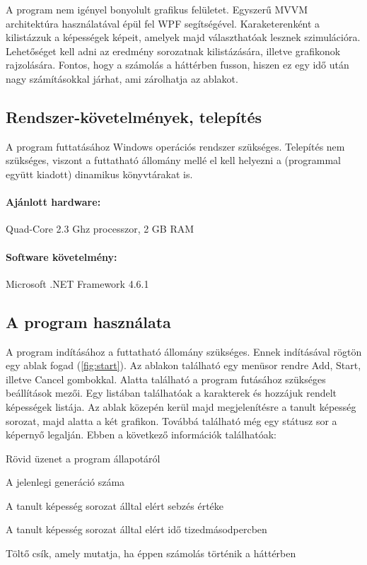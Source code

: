 \documentclass[12pt]{article}
\begin{document}
A program nem igényel bonyolult grafikus felületet. Egyszerű MVVM architektúra használatával épül fel WPF segítségével. 
Karaketerenként a kilistázzuk a képességek képeit, amelyek majd választhatóak lesznek szimulációra. Lehetőséget kell adni az eredmény sorozatnak kilistázására, illetve grafikonok rajzolására.
Fontos, hogy a számolás a háttérben fusson, hiszen ez egy idő után nagy számításokkal járhat, ami zárolhatja az ablakot.

\subsection{Rendszer-követelmények, telepítés}

A program futtatásához Windows operációs rendszer szükséges. Telepítés nem szükséges, viszont a futtatható állomány mellé el kell helyezni a (programmal együtt kiadott) dinamikus könyvtárakat is.

\paragraph{Ajánlott hardware:} 

Quad-Core 2.3 Ghz processzor, 2 GB RAM

\paragraph{Software követelmény:} 

Microsoft .NET Framework 4.6.1

\subsection{A program használata}

A program indításához a futtatható állomány szükséges. Ennek indításával rögtön egy ablak fogad (\ref{fig:start}). Az ablakon található egy menüsor rendre Add, Start, illetve Cancel gombokkal. Alatta található a program futásához szükséges beállítások mezői. Egy listában találhatóak a karakterek és hozzájuk rendelt képességek listája. Az ablak közepén kerül majd megjelenítésre a tanult képesség sorozat, majd alatta a két grafikon. Továbbá található még egy státusz sor a képernyő legalján. Ebben a következő információk találhatóak: 

\begin{description}[align=right,labelwidth=3cm]
	\item [Status] Rövid üzenet a program állapotáról
	\item [Generations] A jelenlegi generáció száma
	\item [Damage] A tanult képesség sorozat álltal elért sebzés értéke
	\item [Duration] A tanult képesség sorozat álltal elért idő tizedmásodpercben
	\item [Bar] Töltő csík, amely mutatja, ha éppen számolás történik a háttérben
\end{description}
\end{document}
